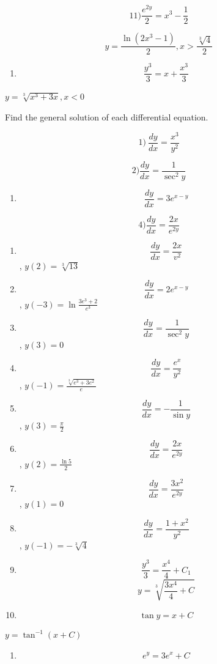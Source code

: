 \documentclass[
]{article}
\providecommand{\tightlist}{%
  \setlength{\itemsep}{0pt}\setlength{\parskip}{0pt}}
\begin{document}
\[11) \frac{e^{2y}}{2} = x^3 - \frac{1}{2}\]

\[y = \frac{\ln(2x^3 - 1)}{2}, x > \frac{\sqrt[3]{4}}{2}\]

\begin{enumerate}
\def\labelenumi{\arabic{enumi})}
\setcounter{enumi}{11}
\tightlist
\item
  \[\frac{y^3}{3} = x + \frac{x^3}{3}\]
\end{enumerate}

\(y = \sqrt[3]{x^3 + 3x}, x < 0\)

Find the general solution of each differential equation.

\[1) \ \frac{dy}{dx} = \frac{x^3}{y^2}\]

\[2) \frac{dy}{dx} = \frac{1}{\sec^2 y}\]

\begin{enumerate}
\def\labelenumi{\arabic{enumi})}
\setcounter{enumi}{2}
\tightlist
\item
  \[\frac{dy}{dx} = 3e^{x-y}\]
\end{enumerate}

\[4) \frac{dy}{dx} = \frac{2x}{e^{2y}}\]

\begin{enumerate}
\def\labelenumi{\arabic{enumi})}
\setcounter{enumi}{4}
\item
  \[\frac{dy}{dx} = \frac{2x}{v^2}\] , \(y(2) = \sqrt[3]{13}\)
\item
  \[\frac{dy}{dx} = 2e^{x-y}\] , \(y(-3) = \ln \frac{3e^3 + 2}{e^3}\)
\item
  \[\frac{dy}{dx} = \frac{1}{\sec^2 y}\] , \(y(3) = 0\)
\item
  \[\frac{dy}{dx} = \frac{e^x}{y^2}\] ,
  \(y(-1) = \frac{\sqrt[3]{e^3 + 3e^2}}{e}\)
\item
  \[\frac{dy}{dx} = -\frac{1}{\sin y}\] , \(y(3) = \frac{\pi}{2}\)
\item
  \[\frac{dy}{dx} = \frac{2x}{e^{2y}}\] , \(y(2) = \frac{\ln 5}{2}\)
\item
  \[\frac{dy}{dx} = \frac{3x^2}{e^{2y}}\] , \(y(1) = 0\)
\item
  \[\frac{dy}{dx} = \frac{1+x^2}{y^2}\] , \(y(-1) = -\sqrt[3]{4}\)
\item
  \[\frac{y^3}{3} = \frac{x^4}{4} + C_1\]
  \[y = \sqrt[3]{\frac{3x^4}{4} + C}\]
\item
  \[\tan y = x + C\]
\end{enumerate}

\(y = \tan^{-1} (x + C)\)

\begin{enumerate}
\def\labelenumi{\arabic{enumi})}
\setcounter{enumi}{2}
\tightlist
\item
  \[e^y = 3e^x + C\]
\end{enumerate}
\end{document}
